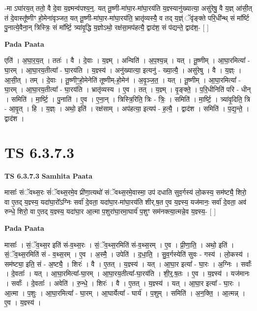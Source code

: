 \documentclass[17pt]{extarticle}
\begin{document}
-मा ऽघा॑रय॒त् ततो॒ वै दे॒वा य॒ज्ञ्मन्व॑पश्य॒न्॒. यत् तू॒ष्णी-मा॑घा॒र-मा॑घा॒रय॑ति य॒ज्ञ्स्यानु॑ख्यात्या॒ असु॑रेषु॒ वै य॒ज्ञ् आ॑सी॒त् तं दे॒वास्तू᳚ष्णीꣳ हो॒मेना॑वृञ्जत॒ यत् तू॒ष्णी-मा॑घा॒र-मा॑घा॒रय॑ति॒ भ्रातृ॑व्यस्यै॒ व तद् य॒ज्ञ्ं ॅवृ॑ङ्क्ते परि॒धी॑न्थ् सं मा᳚र्ष्टि पु॒नात्ये॒वैना॒न् त्रिस्त्रिः॒ सं मा᳚र्ष्टि॒ त्र्या॑वृ॒द्धि य॒ज्ञोऽथो॒ रक्ष॑सा॒मप॑हत्यै॒ द्वाद॑श॒ सं प॑द्यन्ते॒ द्वाद॑श॒- [  ] \newline

\textbf{Pada Paata} \newline

एति॑ । अ॒घा॒र॒य॒त् । ततः॑ । वै । दे॒वाः । य॒ज्ञ्म् । अन्विति॑ । अ॒प॒श्य॒न्न् । यत् । तू॒ष्णीम् । आ॒घा॒रमित्या᳚ - घा॒रम् । आ॒घा॒रय॒तीत्या᳚ - घा॒रय॑ति । य॒ज्ञ्स्य॑ । अनु॑ख्यात्या॒ इत्यनु॑ - ख्या॒त्यै॒ । असु॑रेषु । वै । य॒ज्ञ्ः । आ॒सी॒त् । तम् । दे॒वाः । तू॒ष्णीꣳ॒॒हो॒मेनेति॑ तूष्णीम्-हो॒मेन॑ । अ॒वृ॒ञ्ज॒त॒ । यत् । तू॒ष्णीम् । आ॒घा॒रमित्या᳚ - घा॒रम् । आ॒घा॒रय॒तीत्या᳚ - घा॒रय॑ति । भ्रातृ॑व्यस्य । ए॒व । तत् । य॒ज्ञ्म् । वृ॒ङ्क्ते॒ । प॒रि॒धीनिति॑ परि - धीन् । समिति॑ । मा॒र्ष्टि॒ । पु॒नाति॑ । ए॒व । ए॒ना॒न् । त्रिस्त्रि॒रिति॒ त्रिः - त्रिः॒ । समिति॑ । मा॒र्ष्टि॒ । त्र्या॑वृ॒दिति॒ त्रि - आ॒वृ॒त् । हि । य॒ज्ञ्ः । अथो॒ इति॑ । रक्ष॑साम् । अप॑हत्या॒ इत्यप॑ - ह॒त्यै॒ । द्वाद॑श । समिति॑ । प॒द्य॒न्ते॒ । द्वाद॑श ।  \newline




\section*{ TS 6.3.7.3 }

\textbf{TS 6.3.7.3 } \newline
\textbf{Samhita Paata} \newline

मासाः᳚ संॅवथ्स॒रः सं॑ॅवथ्स॒रमे॒व प्री॑णा॒त्यथो॑ संॅवथ्स॒रमे॒वास्मा॒ उप॑ दधाति सुव॒र्गस्य॑ लो॒कस्य॒ सम॑ष्ट्यै॒ शिरो॒ वा ए॒तद् य॒ज्ञ्स्य॒ यदा॑घा॒रो᳚ऽग्निः सर्वा॑ दे॒वता॒ यदा॑घा॒र-मा॑घा॒रय॑ति शीर्.ष॒त ए॒व य॒ज्ञ्स्य॒ यज॑मानः॒ सर्वा॑ दे॒वता॒ अव॑ रुन्धे॒ शिरो॒ वा ए॒तद् य॒ज्ञ्स्य॒ यदा॑घा॒र आ॒त्मा प॒शुरा॑घा॒रमा॒घार्य॑ प॒शुꣳ सम॑नक्त्या॒त्मन्ने॒व य॒ज्ञ्स्य॒- [  ] \newline

\textbf{Pada Paata} \newline

मासाः᳚ । सं॒ॅव॒थ्स॒र इति॑ सं-व॒थ्स॒रः । सं॒ॅव॒थ्स॒रमिति॑ सं-व॒थ्स॒रम् । ए॒व । प्री॒णा॒ति॒ । अथो॒ इति॑ । सं॒ॅव॒थ्स॒रमिति॑ सं - व॒थ्स॒रम् । ए॒व । अ॒स्मै॒ । उपेति॑ । द॒धा॒ति॒ । सु॒व॒र्गस्येति॑ सुवः - गस्य॑ । लो॒कस्य॑ । सम॑ष्ट्या॒ इति॒ सं - अ॒ष्ट्यै॒ । शिरः॑ । वै । ए॒तत् । य॒ज्ञ्स्य॑ । यत् । आ॒घा॒र इत्या᳚ - घा॒रः । अ॒ग्निः । सर्वाः᳚ । दे॒वताः᳚ । यत् । आ॒घा॒रमित्या᳚-घा॒रम् । आ॒घा॒रय॒तीत्या᳚-घा॒रय॑ति । शी॒र्॒.ष॒तः । ए॒व । य॒ज्ञ्स्य॑ । यज॑मानः । सर्वाः᳚ । दे॒वताः᳚ । अवेति॑ । रु॒न्धे॒ । शिरः॑ । वै । ए॒तत् । य॒ज्ञ्स्य॑ । यत् । आ॒घा॒र इत्या᳚ - घा॒रः । आ॒त्मा । प॒शुः । आ॒घा॒रमित्या᳚ - घा॒रम् । आ॒घार्येत्या᳚ - घार्य॑ । प॒शुम् । समिति॑ । अ॒न॒क्ति॒ । आ॒त्मन्न् । ए॒व । य॒ज्ञ्स्य॑ ।  \newline
\end{document}
